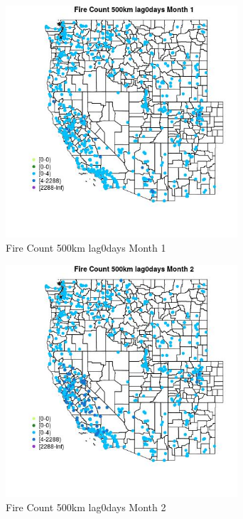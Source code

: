 \begin{figure} 
\centering  
\includegraphics[width=0.77\textwidth]{Code_Outputs/Report_ML_input_PM25_Step4_part_e_de_duplicated_aves_compiled_2019-05-21wNAs_MapObsMo1Fire_Count_500km_lag0days.jpg} 
\caption{\label{fig:Report_ML_input_PM25_Step4_part_e_de_duplicated_aves_compiled_2019-05-21wNAsMapObsMo1Fire_Count_500km_lag0days}Fire Count 500km lag0days Month 1} 
\end{figure} 
 

\clearpage 

\begin{figure} 
\centering  
\includegraphics[width=0.77\textwidth]{Code_Outputs/Report_ML_input_PM25_Step4_part_e_de_duplicated_aves_compiled_2019-05-21wNAs_MapObsMo2Fire_Count_500km_lag0days.jpg} 
\caption{\label{fig:Report_ML_input_PM25_Step4_part_e_de_duplicated_aves_compiled_2019-05-21wNAsMapObsMo2Fire_Count_500km_lag0days}Fire Count 500km lag0days Month 2} 
\end{figure} 
 

